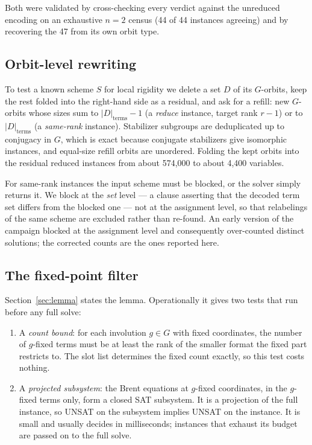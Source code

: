 \documentclass[11pt]{article}
\begin{document}
Both were validated by cross-checking every verdict against the unreduced encoding on an exhaustive
$n=2$ census (44 of 44 instances agreeing) and by recovering the 47 from its own orbit type.

\subsection{Orbit-level rewriting}

To test a known scheme $S$ for local rigidity we delete a set $D$ of its $G$-orbits, keep the rest folded
into the right-hand side as a residual, and ask for a refill: new $G$-orbits whose sizes sum to
$|D|_{\mathrm{terms}}-1$ (a \emph{reduce} instance, target rank $r-1$) or to
$|D|_{\mathrm{terms}}$ (a \emph{same-rank} instance). Stabilizer subgroups are deduplicated up to
conjugacy in $G$, which is exact because conjugate stabilizers give isomorphic instances, and equal-size
refill orbits are unordered. Folding the kept orbits into the residual reduced instances from about
574{,}000 to about 4{,}400 variables.

For same-rank instances the input scheme must be blocked, or the solver simply returns it. We block at
the \emph{set} level --- a clause asserting that the decoded term set differs from the blocked one --- not
at the assignment level, so that relabelings of the same scheme are excluded rather than re-found. An
early version of the campaign blocked at the assignment level and consequently over-counted distinct
solutions; the corrected counts are the ones reported here.

\subsection{The fixed-point filter}
\label{sec:fixedpoint}

Section~\ref{sec:lemma} states the lemma. Operationally it gives two tests that run before any full
solve:

\begin{enumerate}
\item A \emph{count bound}: for each involution $g\in G$ with fixed coordinates, the number of $g$-fixed
terms must be at least the rank of the smaller format the fixed part restricts to. The slot list
determines the fixed count exactly, so this test costs nothing.
\item A \emph{projected subsystem}: the Brent equations at $g$-fixed coordinates, in the $g$-fixed terms
only, form a closed SAT subsystem. It is a projection of the full instance, so UNSAT on the subsystem
implies UNSAT on the instance. It is small and usually decides in milliseconds; instances that exhaust
its budget are passed on to the full solve.
\end{enumerate}
\end{document}
